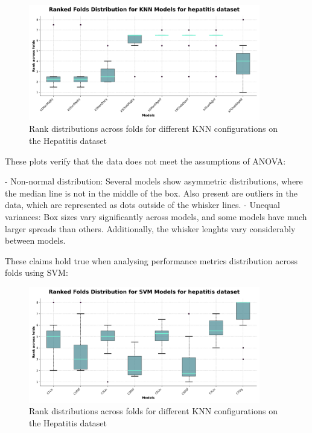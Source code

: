\begin{figure}[!ht]
    \centering
    \includegraphics[width=0.9\textwidth]{figures/ranked_folds_KNN_hepatitis.png}
    \caption{Rank distributions across folds for different KNN configurations on the Hepatitis dataset}
\label{fig:ranked-folds-knn-hepatitis}
\end{figure}

These plots verify that the data does not meet the assumptions of ANOVA:

- Non-normal distribution: Several models show asymmetric distributions, where the median line is not in the middle of the box.
Also present are outliers in the data, which are represented as dots outside of the whisker lines.
- Unequal variances: Box sizes vary significantly across models, and some models have much larger spreads than others.
Additionally, the whisker lenghts vary considerably between models.

These claims hold true when analysing performance metrics distribution across folds using SVM:

\begin{figure}[!ht]
    \centering
    \includegraphics[width=0.9\textwidth]{figures/ranked_folds_SVM_hepatitis.png}
    \caption{Rank distributions across folds for different KNN configurations on the Hepatitis dataset}
\label{fig:ranked-folds-svm-hepatitis}
\end{figure}

